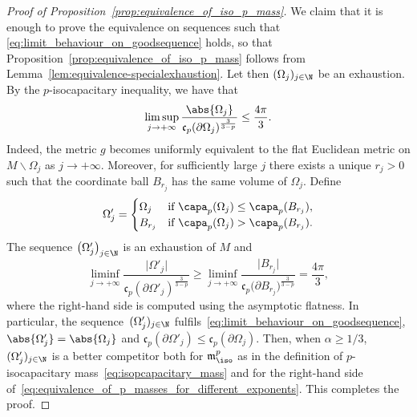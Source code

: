 \documentclass[10pt,a4paper]{amsart}
\numberwithin{equation}{section}
\newcounter{case}
\renewcommand{\ncapa}{\mathfrak{c}}
\newcommand{\ma}{\mathfrak{m}}
\begin{document}
\begin{proof}[Proof of Proposition~\ref{prop:equivalence_of_iso_p_mass}] We claim that it is enough to prove the equivalence on sequences such that
\eqref{eq:limit_behaviour_on_goodsequence} holds, so that Proposition~\ref{prop:equivalence_of_iso_p_mass} follows from Lemma~\ref{lem:equivalence-specialexhaustion}.
 Let then $(\Omega_j)_{j \in \N}$ be an exhaustion. By the $p$-isocapacitary inequality, we have that
\[
 \limsup_{j \to +\infty} \frac{\abs{\Omega_j}}{\ncapa_p(\partial \Omega_j)^{\frac{3}{3-p}}} \leq \frac{4 \pi }{3}.
\]
Indeed, the metric $g$ becomes uniformly equivalent to the flat Euclidean metric on $M \smallsetminus \Omega_j$ as $j \to +\infty$.
Moreover, for sufficiently large $j$ there exists a unique $r_j>0$ such that the coordinate ball $B_{r_j}$ has the same volume of $\Omega_j$. Define
\[
 \Omega'_j= \begin{cases}
 \Omega_j & \text{if } \capa_p(\Omega_j)\leq \capa_p(B_{r_j}),\\
 B_{r_j} & \text{if } \capa_p(\Omega_j)> \capa_p(B_{r_j}).
 \end{cases}
\]
The sequence $\big(\Omega'_j\big)_{j\in \N}$ is an exhaustion of $M$ and
\[
 \liminf_{j \to +\infty} \frac{\big|\Omega'_j\big|}{\ncapa_p(\partial \Omega'_j)^{\frac{3}{3-p}}}\geq\liminf_{j \to +\infty} \frac{\big|B_{r_j}\big|}{\ncapa_p\big(\partial B_{r_j}\big)^{\frac{3}{3-p}}}= \frac{4 \pi }{3},
\]
where the right-hand side is computed using the asymptotic flatness. In particular, the sequence~$(\Omega'_j)_{j\in \N}$ fulfils~\eqref{eq:limit_behaviour_on_goodsequence}, $\abs{\Omega'_j}= \abs{\Omega_j}$ and $\ncapa_p(\partial\Omega'_j)\leq \ncapa_p(\partial\Omega_j)$. Then, when $\alpha \geq 1/3$, $(\Omega'_j)_{j \in \N}$ is a better competitor both for $\ma^p_{\iso}$ as in the definition of $p$-isocapacitary mass~\eqref{eq:isopcapacitary_mass} and for the right-hand side of~\eqref{eq:equivalence_of_p_masses_for_different_exponents}. This completes the proof.
 \end{proof}
\end{document}
